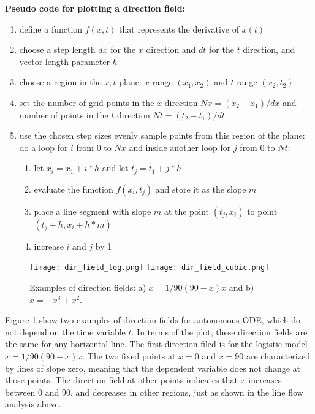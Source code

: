 \documentclass[11pt]{book}
\begin{document}
\textbf{Pseudo code for plotting a direction field:}
\begin{enumerate}
\item define a function $f(x, t)$ that represents the derivative of $x(t)$
\item choose a step length $dx$ for the $x$ direction and $dt$ for the $t$ direction, and vector length parameter $h$
\item choose a region in the $x,t$ plane: $x$ range $(x_1,x_2)$ and $t$ range $(x_2,t_2)$
\item set the number of grid points in the $x$ direction $Nx = (x_2-x_1)/dx$  and number of points in the $t$ direction $Nt = (t_2-t_1)/dt$
\item use the chosen step sizes evenly sample points from this region of the plane: do a loop for $i$ from 0 to $ Nx$ and inside another loop for $j$ from 0 to $Nt$:
 \begin{enumerate}
  \item let $x_i = x_1 + i*h$ and let $t_j = t_1 + j*h$
   \item evaluate the function $ f(x_i,t_j)$ and store it as the slope $m$
   \item place a line segment with slope $m$ at the point $(t_j, x_i)$ to point $(t_j + h, x_i+h*m)$
   \item increase $i$ and $j$ by 1
   \end{enumerate}
\end{enumerate}

\begin{figure}[htbp] %
   \centering
   \texttt{[image: dir\_field\_log.png]}
   \texttt{[image: dir\_field\_cubic.png]}
   \caption{Examples of direction fields: a) $\dot x = 1/90(90-x)x$ and b)  $ \dot x = -x^3 + x^2 $.}
   \label{fig:dir_fields_examples}
\end{figure}

Figure \ref{fig:dir_fields_examples} show two examples of direction fields for autonomous ODE, which do not depend on the time variable $t$. In terms of the plot, these direction fields are the same for any horizontal line. The first direction filed is for the logistic model $\dot x = 1/90(90-x)x$. The two fixed points at $x=0$ and $x=90$ are characterized by lines of slope zero, meaning that the dependent variable does not change at those points. The direction field at other points indicates that $x$ increases between 0 and 90, and decreases in other regions, just as shown in the line flow analysis above.
\end{document}
